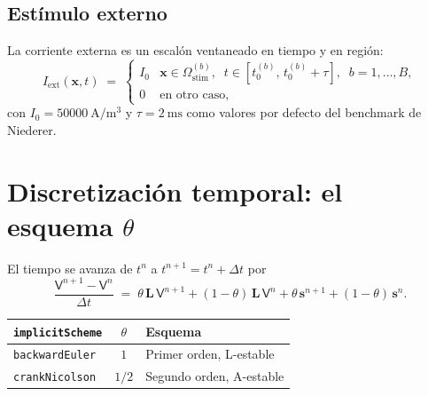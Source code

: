 \documentclass[11pt,a4paper]{article}
\newcommand{\code}[1]{\texttt{\small #1}}
\newcommand{\Lop}{\mathbf{L}}
\newcommand{\Iext}{I_{\mathrm{ext}}}
\begin{document}
\subsection{Estímulo externo}

La corriente externa es un escalón ventaneado en tiempo y en región:
\begin{equation}
  \Iext(\mathbf{x}, t) \;=\;
  \begin{cases}
    I_{0} & \mathbf{x} \in \Omega_{\text{stim}}^{(b)},
            \;\; t \in [t_{0}^{(b)},\, t_{0}^{(b)} + \tau],
            \;\; b = 1, \dots, B, \\
    0     & \text{en otro caso},
  \end{cases}
\end{equation}
con $I_{0} = \SI{50000}{\ampere\per\meter\cubed}$ y
$\tau = \SI{2}{\milli\second}$ como valores por defecto del benchmark de Niederer.

\section{Discretización temporal: el esquema $\theta$}

El tiempo se avanza de $t^{n}$ a $t^{n+1} = t^{n} + \Delta t$ por
\begin{equation}
  \frac{\mathsf{V}^{n+1} - \mathsf{V}^{n}}{\Delta t}
   \;=\;
   \theta\, \Lop\, \mathsf{V}^{n+1}
   + (1-\theta)\, \Lop\, \mathsf{V}^{n}
   + \theta\, \mathbf{s}^{n+1}
   + (1-\theta)\, \mathbf{s}^{n}.
   \label{eq:theta}
\end{equation}

\begin{center}
\begin{tabular}{@{}lcl@{}}
\toprule
\code{implicitScheme} & $\theta$ & Esquema \\
\midrule
\code{backwardEuler} & $1$   & Primer orden, L-estable \\
\code{crankNicolson} & $1/2$ & Segundo orden, A-estable \\
\bottomrule
\end{tabular}
\end{center}
\end{document}
